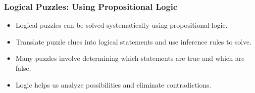 \documentclass{beamer}
\begin{document}
                                    \begin{frame}
                                    \frametitle{Logical Puzzles: Using Propositional Logic}
                                    \begin{itemize}
                                        \item Logical puzzles can be solved systematically using propositional logic.
                                        \item Translate puzzle clues into logical statements and use inference rules to solve.
                                        \item Many puzzles involve determining which statements are true and which are false.
                                        \item Logic helps us analyze possibilities and eliminate contradictions.
                                    \end{itemize}
                                    
                      
                                    \end{frame}
                                    
\end{document}
